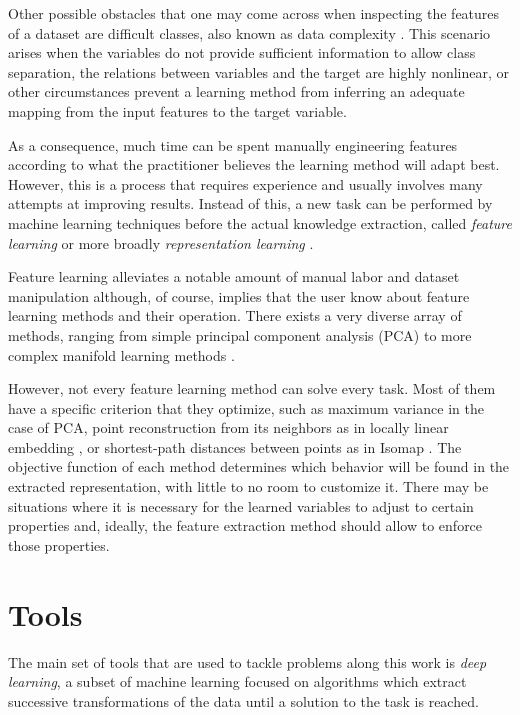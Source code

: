 Other possible obstacles that one may come across when inspecting the features of a dataset are difficult classes, also known as data complexity . This scenario arises when the variables do not provide sufficient information to allow class separation, the relations between variables and the target are highly nonlinear, or other circumstances prevent a learning method from inferring an adequate mapping from the input features to the target variable.

As a consequence, much time can be spent manually engineering features according to what the practitioner believes the learning method will adapt best. However, this is a process that requires experience and usually involves many attempts at improving results. Instead of this, a new task can be performed by machine learning techniques before the actual knowledge extraction, called \textit{feature learning} or more broadly \textit{representation learning} . 

Feature learning alleviates a notable amount of manual labor and dataset manipulation although, of course, implies that the user know about feature learning methods and their operation. There exists a very diverse array of methods, ranging from simple principal component analysis (PCA)  to more complex manifold learning methods .

However, not every feature learning method can solve every task. Most of them have a specific criterion that they optimize, such as maximum variance in the case of PCA, point reconstruction from its neighbors as in locally linear embedding , or shortest-path distances between points as in Isomap . The objective function of each method determines which behavior will be found in the extracted representation, with little to no room to customize it. There may be situations where it is necessary for the learned variables to adjust to certain properties and, ideally, the feature extraction method should allow to enforce those properties.

\section{Tools}

The main set of tools that are used to tackle problems along this work is \textit{deep learning}, a subset of machine learning focused on algorithms which extract successive transformations of the data until a solution to the task is reached.

